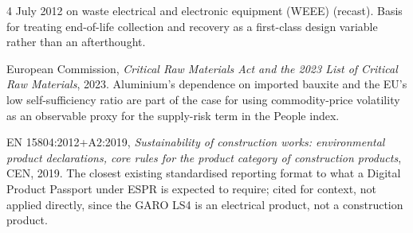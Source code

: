 \documentclass[11pt,a4paper]{article}
\begin{document}
\begin{enumerate}[label={[\arabic*]}]
4 July 2012 on waste electrical and electronic equipment (WEEE) (recast).
Basis for treating end-of-life collection and recovery as a first-class
design variable rather than an afterthought.
\item European Commission, \emph{Critical Raw Materials Act and the 2023
List of Critical Raw Materials}, 2023. Aluminium's dependence on imported
bauxite and the EU's low self-sufficiency ratio are part of the case for
using commodity-price volatility as an observable proxy for the
supply-risk term in the People index.
\item EN 15804:2012+A2:2019, \emph{Sustainability of construction works:
environmental product declarations, core rules for the product category
of construction products}, CEN, 2019. The closest existing standardised
reporting format to what a Digital Product Passport under ESPR is expected
to require; cited for context, not applied directly, since the GARO LS4 is
an electrical product, not a construction product.
\end{enumerate}
\end{document}
